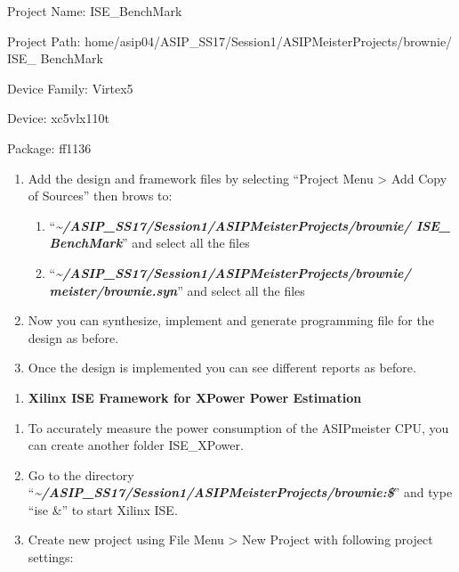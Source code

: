 \documentclass[
]{article}
\begin{document}
Project Name: ISE\_BenchMark

Project Path:
home/asip04/ASIP\_SS17/Session1/ASIPMeisterProjects/brownie/ ISE\_
BenchMark

Device Family: Virtex5

Device: xc5vlx110t

Package: ff1136

\begin{enumerate}
\def\labelenumi{\arabic{enumi}.}
\setcounter{enumi}{20}
\item
  Add the design and framework files by selecting ``Project Menu
  \textgreater{} Add Copy of Sources'' then brows to:

  \begin{enumerate}
  \def\labelenumii{\alph{enumii}.}
  \item
    ``\emph{\textbf{\textasciitilde/ASIP\_SS17/Session1/ASIPMeisterProjects/brownie/
    ISE\_}} \emph{\textbf{BenchMark}}'' and select all the files
  \item
    ``\emph{\textbf{\textasciitilde/ASIP\_SS17/Session1/ASIPMeisterProjects/brownie/
    meister/brownie.syn}}'' and select all the files
  \end{enumerate}
\item
  Now you can synthesize, implement and generate programming file for
  the design as before.
\item
  Once the design is implemented you can see different reports as
  before.
\end{enumerate}

\begin{enumerate}
\def\labelenumi{\Alph{enumi}.}
\setcounter{enumi}{2}
\item
  \textbf{Xilinx ISE Framework for XPower Power Estimation}
\end{enumerate}

\begin{enumerate}
\def\labelenumi{\arabic{enumi}.}
\setcounter{enumi}{23}
\item
  To accurately measure the power consumption of the ASIPmeister CPU,
  you can create another folder ISE\_XPower.
\item
  Go to the directory
  ``\emph{\textbf{\textasciitilde/ASIP\_SS17/Session1/ASIPMeisterProjects/brownie:\$}}''
  and type ``ise \&'' to start Xilinx ISE.
\item
  Create new project using File Menu \textgreater{} New Project with
  following project settings:
\end{enumerate}
\end{document}
